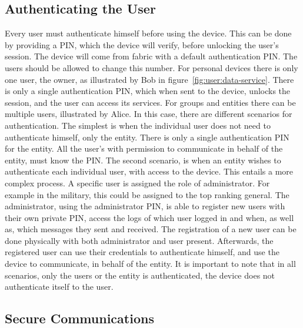 \subsection{Authenticating the User}\label{chap:problem:scenarios:auth}

Every user must authenticate himself before using the device. This can be done by providing a \ac{PIN}, which the device will verify, before unlocking the user's session.
The device will come from fabric with a default authentication \ac{PIN}. The users should be allowed to change this number.
For personal devices there is only one user, the owner, as illustrated by Bob in figure~\ref{fig:user:data-service}. There is only a single authentication \ac{PIN}, which when sent to the device, unlocks the session, and the user can access its services.
For groups and entities there can be multiple users, illustrated by Alice. In this case, there are different scenarios for authentication.
The simplest is when the individual user does not need to authenticate himself, only the entity. There is only a single authentication \ac{PIN} for the entity. All the user's with permission to communicate in behalf of the entity, must know the \ac{PIN}.
The second scenario, is when an entity wishes to authenticate each individual user, with access to the device. 
This entails a more complex process. A specific user is assigned the role of administrator. For example in the military, this could be assigned to the top ranking general. The administrator, using the administrator \ac{PIN}, is able to register new users with their own private \ac{PIN}, access the logs of which user logged in and when, as well as, which messages they sent and received.
The registration of a new user can be done physically with both administrator and user present. Afterwards, the registered user can use their credentials to authenticate himself, and use the device to communicate, in behalf of the entity.
It is important to note that in all scenarios, only the users or the entity is authenticated, the device does not authenticate itself to the user.

\subsection{Secure Communications}\label{chap:problem:scenarios:comms}

